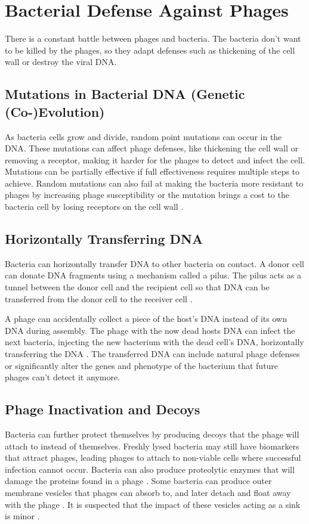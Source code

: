 \section{Bacterial Defense Against Phages} 
\label{sec:literaturereview:bacterial_defense_against_phages}
There is a constant battle between phages and bacteria. 
The bacteria don't want to be killed by the phages, so they adapt defenses such as thickening of the cell wall or destroy the viral DNA. 

\subsection{Mutations in Bacterial DNA (Genetic (Co-)Evolution)}
As bacteria cells grow and divide, random point mutations can occur in the DNA. 
These mutations can affect phage defenses, like thickening the cell wall or removing a receptor, making it harder for the phages to detect and infect the cell. 
Mutations can be partially effective if full effectiveness requires multiple steps to achieve. 
Random mutations can also fail at making the bacteria more resistant to phages by increasing phage susceptibility or the mutation brings a cost to the bacteria cell by losing receptors on the cell wall \cite{lenskiTWOSTEPRESISTANCEESCHERICHIA1984}. 

\subsection{Horizontally Transferring DNA}
Bacteria can horizontally transfer DNA to other bacteria on contact. 
A donor cell can donate DNA fragments using a mechanism called a pilus. 
The pilus acts as a tunnel between the donor cell and the recipient cell so that DNA can be transferred from the donor cell to the receiver cell \cite{harbSsRNAPhagePenetration2020}. 

A phage can accidentally collect a piece of the host's DNA instead of its own DNA during assembly. 
The phage with the now dead hosts DNA can infect the next bacteria, injecting the new bacterium with the dead cell's DNA, horizontally transferring the DNA \cite{tamangHorizontalGeneTransfer2023, kasmanBacteriophages2025}. 
The transferred DNA can include natural phage defenses or significantly alter the genes and phenotype of the bacterium that future phages can't detect it anymore. 

\subsection{Phage Inactivation and Decoys}
Bacteria can further protect themselves by producing decoys that the phage will attach to instead of themselves. 
Freshly lysed bacteria may still have biomarkers that attract phages, leading phages to attach to non-viable cells where successful infection cannot occur.
Bacteria can also produce proteolytic enzymes that will damage the proteins found in a phage \cite{tanQuorumSensingDetermines2015}. 
Some bacteria can produce outer membrane vesicles that phages can absorb to, and later detach and float away with the phage \cite{rabinovitchBacterialDebrisEcological2003}. 
It is suspected that the impact of these vesicles acting as a sink is minor \cite{bullPhageBacterialDynamicsSpatial2018}. 

